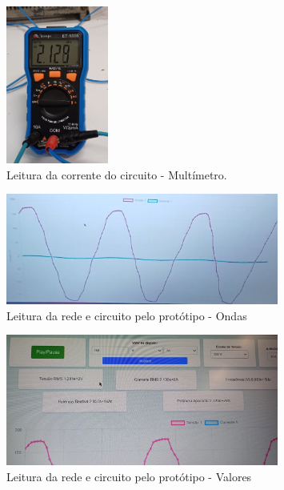 \begin{figure}[htb!]
    \caption{Leitura da corrente do circuito - Multímetro.}
    \label{fig:leitura-rede-mult-c}
    \includegraphics[width=0.3\textwidth]{figuras/leitura-rede-mult-c.png}
    \fonte{}
\end{figure}

\begin{figure}[htb!]
    \caption{Leitura da rede e circuito pelo protótipo - Ondas}
    \label{fig:leitura-rede-boy-ondas}
    \includegraphics[width=0.8\textwidth]{figuras/leitura-rede-boy-ondas.png}
    \fonte{}
\end{figure}

\begin{figure}[htb!]
    \caption{Leitura da rede e circuito pelo protótipo - Valores}
    \label{fig:leitura-rede-boy-valores}
    \includegraphics[width=0.8\textwidth]{figuras/leitura-rede-boy-valores.png}
    \fonte{}
\end{figure}

